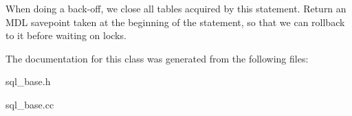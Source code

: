 When doing a back-\/off, we close all tables acquired by this statement. Return an M\+DL savepoint taken at the beginning of the statement, so that we can rollback to it before waiting on locks. 

The documentation for this class was generated from the following files\+:\begin{DoxyCompactItemize}
\item 
sql\+\_\+base.\+h\item 
sql\+\_\+base.\+cc\end{DoxyCompactItemize}
